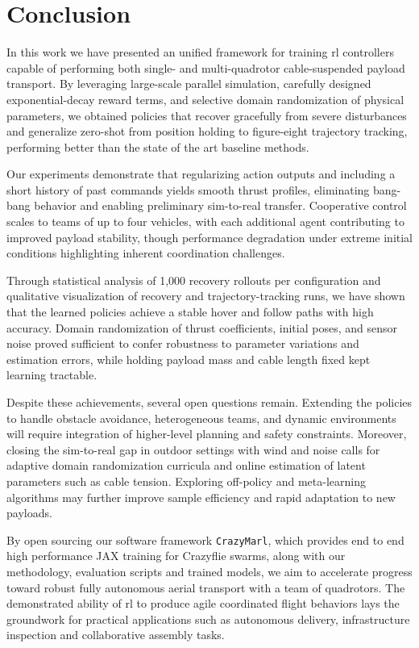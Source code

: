 \chapter{Conclusion}

In this work we have presented an unified framework for training \gls{rl} controllers capable of performing both single- and multi-quadrotor cable-suspended payload transport. By leveraging large-scale parallel simulation, carefully designed exponential-decay reward terms, and selective domain randomization of physical parameters, we obtained policies that recover gracefully from severe disturbances and generalize zero-shot from position holding to figure-eight trajectory tracking, performing better than the state of the art baseline methods.

Our experiments demonstrate that regularizing action outputs and including a short history of past commands yields smooth thrust profiles, eliminating bang-bang behavior and enabling preliminary sim-to-real transfer. Cooperative control scales to teams of up to four vehicles, with each additional agent contributing to improved payload stability, though performance degradation under extreme initial conditions highlighting inherent coordination challenges.

Through statistical analysis of 1,000 recovery rollouts per configuration and qualitative visualization of recovery and trajectory-tracking runs, we have shown that the learned policies achieve a stable hover and follow paths with high accuracy. Domain randomization of thrust coefficients, initial poses, and sensor noise proved sufficient to confer robustness to parameter variations and estimation errors, while holding payload mass and cable length fixed kept learning tractable.

Despite these achievements, several open questions remain. Extending the policies to handle obstacle avoidance, heterogeneous teams, and dynamic environments will require integration of higher-level planning and safety constraints. Moreover, closing the sim-to-real gap in outdoor settings with wind and noise calls for adaptive domain randomization curricula and online estimation of latent parameters such as cable tension. Exploring off-policy and meta-learning algorithms may further improve sample efficiency and rapid adaptation to new payloads.

By open sourcing our software framework \texttt{CrazyMarl}, which provides end to end high performance JAX training for Crazyflie swarms, along with our methodology, evaluation scripts and trained models, we aim to accelerate progress toward robust fully autonomous aerial transport with a team of quadrotors. The demonstrated ability of \gls{rl} to produce agile coordinated flight behaviors lays the groundwork for practical applications such as autonomous delivery, infrastructure inspection and collaborative assembly tasks.
